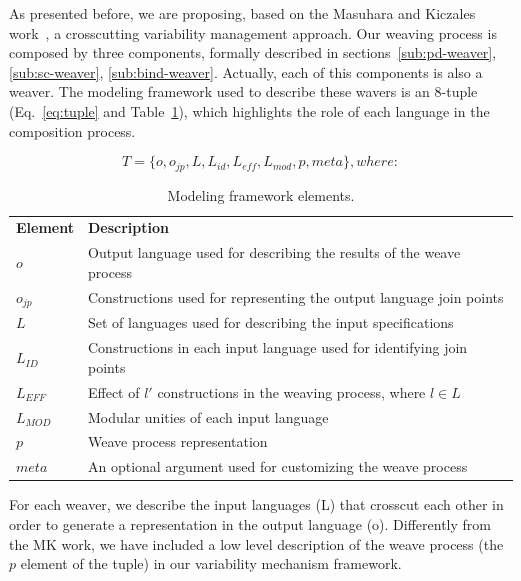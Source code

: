 As presented before, we are proposing, based on the Masuhara and Kiczales work~\cite{kiczales-ecoop-2003}, a crosscutting 
variability management approach. Our weaving process is composed by three components, formally described in sections~\ref{sub:pd-weaver}, \ref{sub:sc-weaver}, \ref{sub:bind-weaver}. Actually, each of this components is also a weaver. The modeling framework used to describe these wavers is an 8-tuple (Eq.~\ref{eq:tuple} and 
Table~\ref{tab:tup-01}), which highlights the role of each language in the composition process. 

\begin{equation}
T = \{o, o_{jp}, L, L_{id}, L_{eff}, L_{mod}, p, meta\}, where:
\label{eq:tuple}
\end{equation}

\begin{table}[h]
\begin{center}
\begin{small}
\caption{Modeling framework elements.} \label{tab:tup-01}
\begin{tabular}{ll}
  \hline\noalign{\smallskip}
  {\bf Element} & {\bf Description} \\ 
  \noalign{\smallskip}
  \hline
  \noalign{\smallskip}
  $o$              & Output language used for describing the results of the weave process \\ 
  $o_{jp}$       & Constructions used for representing the output language join points \\ 
  $L$              & Set of languages used for describing the input specifications \\ 
  $L_{ID}$      & Constructions in each input language used for identifying join points \\ 
  $L_{EFF}$   & Effect of $l'$ constructions in the weaving process, where $l \in L$ \\ 
  $L_{MOD}$  & Modular unities of each input language \\ 
  $p$               & Weave process representation \\ 
  $meta$         & An optional argument used for customizing the weave process \\ 
  \hline
\end{tabular}
\end{small}
\end{center}
\end{table}

For each weaver, we describe the input languages (L) that crosscut each other in order to generate 
a representation in the output language (o). Differently from the MK work, we have included a 
low level description of the weave process (the $p$ element of the tuple) in our variability 
mechanism framework. 

